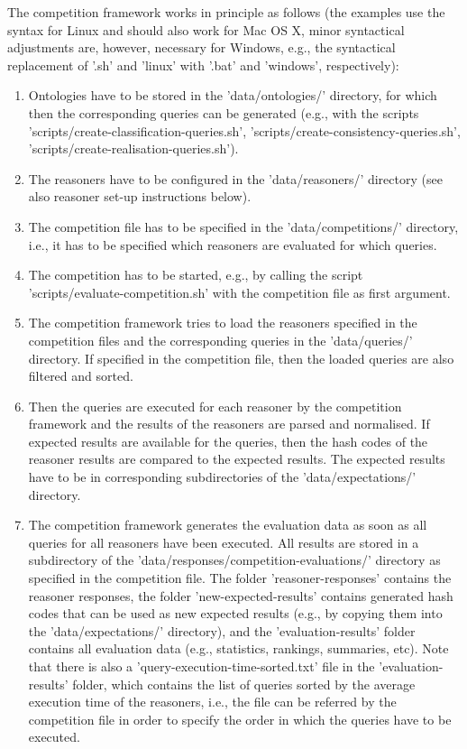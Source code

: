 \documentclass{article}
\begin{document}
The competition framework works in principle as follows (the examples use the syntax for Linux and should also work for Mac OS X, minor syntactical adjustments are, however, necessary for Windows, e.g., the syntactical replacement of '.sh' and 'linux' with '.bat' and 'windows', respectively):
\begin{enumerate}
\item Ontologies have to be stored in the 'data/ontologies/' directory, for which then the corresponding queries can be generated (e.g., with the scripts 'scripts/create-classification-queries.sh', 'scripts/create-consistency-queries.sh', 'scripts/create-realisation-queries.sh').
\item The reasoners have to be configured in the 'data/reasoners/' directory (see also reasoner set-up instructions below).
\item The competition file has to be specified in the 'data/competitions/' directory, i.e., it has to be specified which reasoners are evaluated for which queries.
\item The competition has to be started, e.g., by calling the script 'scripts/evaluate-competition.sh' with the competition file as first argument.
\item The competition framework tries to load the reasoners specified in the competition files and the corresponding queries in the 'data/queries/' directory. 
If specified in the competition file, then the loaded queries are also filtered and sorted.
\item Then the queries are executed for each reasoner by the competition framework and the results of the reasoners are parsed and normalised. 
If expected results are available for the queries, then the hash codes of the reasoner results are compared to the expected results. 
The expected results have to be in corresponding subdirectories of the 'data/expectations/' directory.
\item The competition framework generates the evaluation data as soon as all queries for all reasoners have been executed.
All results are stored in a subdirectory of the 'data/responses/competition-evaluations/' directory as specified in the competition file.
The folder 'reasoner-responses' contains the reasoner responses, the folder 'new-expected-results' contains generated hash codes that can be used as new expected results (e.g., by copying them into the 'data/expectations/' directory), and the 'evaluation-results' folder contains all evaluation data (e.g., statistics, rankings, summaries, etc). 
Note that there is also a 'query-execution-time-sorted.txt' file in the 'evaluation-results' folder, which contains the list of queries sorted by the average execution time of the reasoners, i.e., the file can be referred by the competition file in order to specify the order in which the queries have to be executed.
\end{enumerate}
\end{document}
